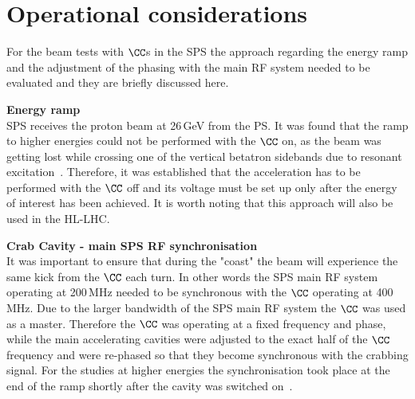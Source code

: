 
\section{Operational considerations}\label{sec:CC_operational_considerations}

For the beam tests with $\CC$s in the SPS the approach regarding the energy ramp and the adjustment of the phasing with the main RF system needed to be evaluated and they are briefly discussed here.

\normalsize{\textbf{Energy ramp}}\\
SPS receives the proton beam at 26\,GeV from the PS. It was found that the ramp to higher energies could not be performed with the $\CC$ on, as the beam was getting lost while crossing one of the vertical betatron sidebands due to resonant excitation~\cite{Rama_Paris_persentation}. Therefore, it was established that the acceleration has to be performed with the $\CC$ off and its voltage must be set up only after the energy of interest has been achieved. It is worth noting that this approach will also be used in the HL-LHC.

\normalsize{\textbf{Crab Cavity - main SPS RF synchronisation}}\\
It was important to ensure that during the "coast" the beam will experience the same kick from the $\CC$ each turn. In other words the SPS main RF system operating at 200\,MHz needed to be synchronous with the $\CC$ operating at 400\,MHz. Due to the larger bandwidth of the SPS main RF system the $\CC$ was used as a master. Therefore the $\CC$ was operating at a fixed frequency and phase, while the main accelerating cavities were adjusted to the exact half of the $\CC$ frequency and were re-phased so that they become synchronous with the crabbing signal. For the studies at higher energies the synchronisation took place at the end of the ramp shortly after the cavity was switched on~\cite{BE_seminar}.



